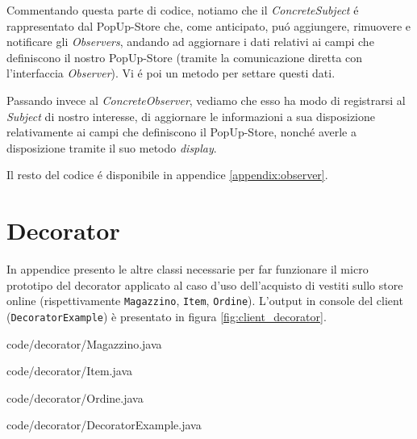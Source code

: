 \documentclass[12pt]{article}
\begin{document}
Commentando questa parte di codice, notiamo che il \textit{ConcreteSubject} \'e rappresentato dal PopUp-Store che, come anticipato, pu\'o aggiungere, rimuovere e notificare gli \textit{Observers}, andando ad aggiornare i dati relativi ai campi che definiscono il nostro PopUp-Store (tramite la comunicazione diretta con l'interfaccia \textit{Observer}). Vi \'e poi un metodo per settare questi dati. 

Passando invece al \textit{ConcreteObserver}, vediamo che esso ha modo di registrarsi al \textit{Subject} di nostro interesse, di aggiornare le informazioni a sua disposizione relativamente ai campi che definiscono il PopUp-Store, nonch\'e averle a disposizione tramite il suo metodo \textit{display}. 

Il resto del codice \'e disponibile in appendice \ref{appendix:observer}.


\newpage

\printbibliography

\newpage
\appendix

\section{Decorator}
\label{appendix:decorator}
In appendice presento le altre classi necessarie per far funzionare il micro prototipo del decorator applicato al caso d'uso dell'acquisto di vestiti sullo store online (rispettivamente {\tt Magazzino}, {\tt Item}, {\tt Ordine}). L'output in console del client ({\tt DecoratorExample}) è presentato in figura \ref{fig:client_decorator}.


{code/decorator/Magazzino.java}


{code/decorator/Item.java}


{code/decorator/Ordine.java}


{code/decorator/DecoratorExample.java}
\end{document}
